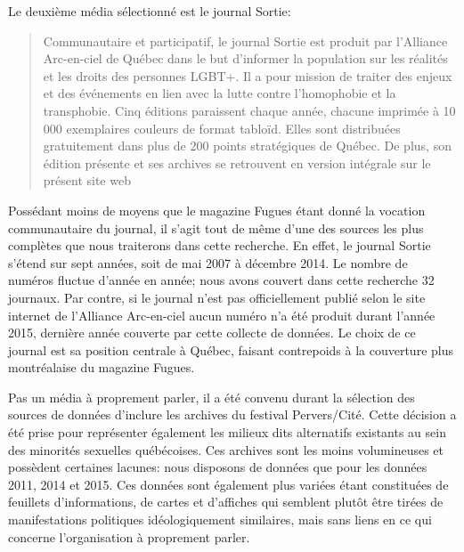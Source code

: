 

Le deuxième média sélectionné est le journal Sortie:
\blockquote[{\cite{AllianceArc2014}}][.]{ Communautaire et participatif, le journal Sortie est produit par l’Alliance Arc-en-ciel de Québec dans le but d’informer la population sur les réalités et les droits des personnes LGBT+.
  Il a pour mission de traiter des enjeux et des événements en lien avec la lutte contre l’homophobie et la transphobie. 
Cinq éditions paraissent chaque année, chacune imprimée à 10 000 exemplaires couleurs de format tabloïd. 
Elles sont distribuées gratuitement dans plus de 200 points stratégiques de Québec.
  De plus, son édition présente et ses archives se retrouvent en version intégrale sur le présent site web} 
Possédant moins de moyens que le magazine Fugues étant donné la vocation communautaire du journal, il s'agit tout de même d'une des sources les plus complètes que nous traiterons dans cette recherche.
En effet, le journal Sortie s'étend sur sept années, soit de mai 2007 à décembre 2014. 
Le nombre de numéros fluctue d'année en année; nous avons couvert dans cette recherche 32 journaux. 
Par contre, si le journal n'est pas officiellement publié selon le site internet de l'Alliance Arc-en-ciel aucun numéro n'a été produit durant l'année 2015, dernière année couverte par cette collecte de données. 
Le choix de ce journal est sa position centrale à Québec, faisant contrepoids à la couverture plus montréalaise du magazine Fugues.

Pas un média à proprement parler, il a été convenu durant la sélection des sources de données d'inclure les archives du festival Pervers/Cité. 
Cette décision a été prise pour représenter également les milieux dits alternatifs existants au sein des minorités sexuelles québécoises. 
Ces archives sont les moins volumineuses et possèdent certaines lacunes: nous disposons de données que pour les données 2011, 2014 et 2015. 
Ces données sont également plus variées étant constituées de feuillets d'informations, de cartes et d'affiches qui semblent plutôt être tirées de manifestations politiques idéologiquement similaires, mais sans liens en ce qui concerne l'organisation à proprement parler.

